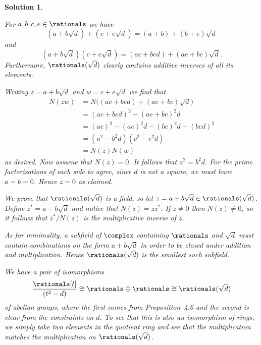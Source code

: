 \documentclass[article, a4paper, 11pt, oneside]{memoir}
\numberwithin{equation}{chapter}
\theoremstyle{nonumberplain}
\newtheorem{solution}{Solution}
\begin{document}
\begin{solution}
\begin{solutionsec}
    \item For $a,b,c,e \in \rationals$ we have
    \begin{equation*}
        (a + b\sqrt{d}) + (c + e\sqrt{d})
            = (a + b) + (b + e) \sqrt{d}
    \end{equation*}
    and
    \begin{equation*}
        (a + b\sqrt{d})(c + e\sqrt{d})
            = (ac + bed) + (ae + bc) \sqrt{d}.
    \end{equation*}
    Furthermore, $\rationals(\sqrt{d})$ clearly contains additive inverses of all its elements.

    \item Writing $z = a + b\sqrt{d}$ and $w = c + e\sqrt{d}$ we find that
    \begin{align*}
        N(zw)
            &= N \bigl( (ac + bed) + (ae + bc) \sqrt{d} \bigr) \\
            &= (ac + bed)^2 - (ae + bc)^2 d \\
            &= (ac)^2 - (ae)^2 d - (bc)^2 d + (bed)^2 \\
            &= (a^2 - b^2 d)(c^2 - e^2 d) \\
            &= N(z) N(w)
    \end{align*}
    as desired. Now assume that $N(z) = 0$. It follows that $a^2 = b^2 d$. For the prime factorisations of each side to agree, since $d$ is not a square, we must have $a = b = 0$. Hence $z = 0$ as claimed.

    \item We prove that $\rationals(\sqrt{d})$ is a field, so let $z = a + b \sqrt{d} \in \rationals(\sqrt{d})$. Define $z^* = a - b \sqrt{d}$ and notice that $N(z) = zz^*$. If $z \neq 0$ then $N(z) \neq 0$, so it follows that $z^*/N(z)$ is the multiplicative inverse of $z$.
    
    As for minimality, a subfield of $\complex$ containing $\rationals$ and $\sqrt{d}$ must contain combinations on the form $a + b \sqrt{d}$ in order to be closed under addition and multiplication. Hence $\rationals(\sqrt{d})$ is the smallest such subfield.

    \item We have a pair of isomorphisms
    \begin{equation*}
        \frac{ \rationals[t] }{ (t^2 - d) }
            \cong \rationals \oplus \rationals
            \cong \rationals(\sqrt{d})
    \end{equation*}
    of abelian groups, where the first comes from Proposition~4.6 and the second is clear from the constraints on $d$. To see that this is also an isomorphism of rings, we simply take two elements in the quotient ring and see that the multiplication matches the multiplication on $\rationals(\sqrt{d})$.
\end{solutionsec}
\end{solution}
\end{document}
